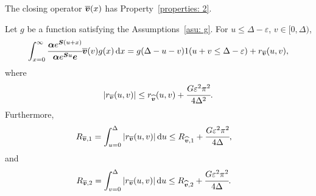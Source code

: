 \begin{cor}\label{cor: cond bnd 2 U2}
	The closing operator \(\overline{\boldsymbol v}(x)\) has Property~\ref{properties: 2}.

	Let \(g\) be a function satisfying the Assumptions~\ref{asu: g}. For \(u\leq \Delta-\varepsilon \), \(v\in[ 0,\Delta)\), 
	\[\int_{x=0}^\infty \cfrac{\boldsymbol \alpha  e^{\boldsymbol{S} (u+x)} }{\boldsymbol \alpha  e^{\boldsymbol{S} u} \boldsymbol e} \overline{\boldsymbol v}(v)g(x)\, \mathrm{d} x = g(\Delta-u-v) 1(u+v\leq\Delta-\varepsilon) + r_{\overline{\boldsymbol v}} (u,v),\]
	where 
	\[\left|r_{\overline{\boldsymbol v}} (u,v)\right|\leq r_{\widehat{\boldsymbol v}} (u,v) + \cfrac{G \varepsilon^2 \pi^2}{4\Delta^2}.\]
	Furthermore,  
	\begin{align*}
		R_{{\overline{\boldsymbol v}},1}&=\int_{u=0}^{\Delta}| r_{\overline{\boldsymbol v}}(u,v)|\, \mathrm{d} u\leq R_{{\widehat{\boldsymbol v}},1} + \cfrac{G \varepsilon^2 \pi^2}{4\Delta},
	\end{align*}
	and
	\begin{align*}
		R_{{\overline{\boldsymbol v}},2}&=\int_{v=0}^{\Delta}| r_{\overline{\boldsymbol v}}(u,v)|\, \mathrm{d} u\leq R_{{\widehat{\boldsymbol v}},2} + \cfrac{G \varepsilon^2 \pi^2}{4\Delta}.
	\end{align*}
\end{cor}
